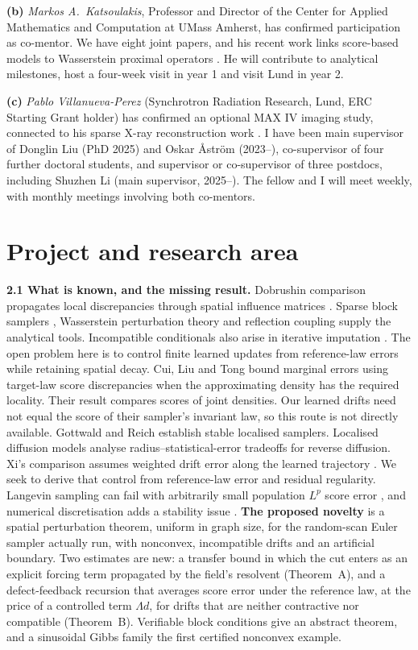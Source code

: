 \documentclass[12pt,a4paper]{article}
\begin{document}
\noindent\textbf{(b)} \textit{Markos A.\ Katsoulakis}, Professor and Director of the Center for Applied Mathematics and Computation at UMass Amherst, has confirmed participation as co-mentor. We have eight joint papers, and his recent work links score-based models to Wasserstein proximal operators \cite{ZLLKO24}. He will contribute to analytical milestones, host a four-week visit in year 1 and visit Lund in year 2.

\noindent\textbf{(c)} \textit{Pablo Villanueva-Perez} (Synchrotron Radiation Research, Lund, ERC Starting Grant holder) has confirmed an optional MAX IV imaging study, connected to his sparse X-ray reconstruction work \cite{Zhang25}.
I have been main supervisor of Donglin Liu (PhD 2025) and Oskar \AA{}str\"om (2023--), co-supervisor of four further doctoral students, and supervisor or co-supervisor of three postdocs, including Shuzhen Li (main supervisor, 2025--). The fellow and I will meet weekly, with monthly meetings involving both co-mentors.

\section{Project and research area}
\textbf{2.1 What is known, and the missing result.} Dobrushin comparison propagates local discrepancies through spatial influence matrices \cite{Dob70,RvH14}. Sparse block samplers \cite{TMM20}, Wasserstein perturbation theory \cite{RS18} and reflection coupling \cite{Eberle16,MMS20} supply the analytical tools. Incompatible conditionals also arise in iterative imputation \cite{LGHSK14}. The open problem here is to control finite learned updates from reference-law errors while retaining spatial decay.
Cui, Liu and Tong \cite{CLT} bound marginal errors using target-law score discrepancies when the approximating density has the required locality. Their result compares scores of joint densities. Our learned drifts need not equal the score of their sampler's invariant law, so this route is not directly available. Gottwald and Reich \cite{GR26} establish stable localised samplers. Localised diffusion models \cite{GLMRT} analyse radius--statistical-error tradeoffs for reverse diffusion. Xi's comparison assumes weighted drift error along the learned trajectory \cite{Xi26}. We seek to derive that control from reference-law error and residual regularity. Langevin sampling can fail with arbitrarily small population $L^p$ score error \cite{CCSW26}, and numerical discretisation adds a stability issue \cite{Zho26}.
\textbf{The proposed novelty} is a spatial perturbation theorem, uniform in graph size, for the random-scan Euler sampler actually run, with nonconvex, incompatible drifts and an artificial boundary. Two estimates are new: a transfer bound in which the cut enters as an explicit forcing term propagated by the field's resolvent (Theorem~A), and a defect-feedback recursion that averages score error under the reference law, at the price of a controlled term $\Lambda d$, for drifts that are neither contractive nor compatible (Theorem~B). Verifiable block conditions give an abstract theorem, and a sinusoidal Gibbs family the first certified nonconvex example. %
\end{document}
